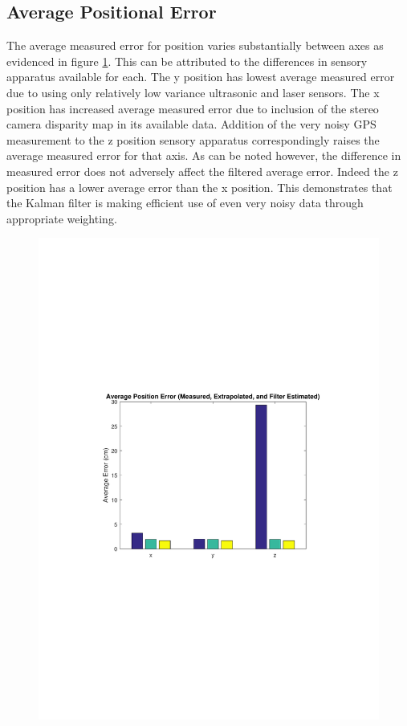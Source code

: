 \subsection{Average Positional Error}
The average measured error for position varies substantially between axes as evidenced in figure \ref{fig:analysisposition}. This can be attributed to the differences in sensory apparatus available for each. The y position has lowest average measured error due to using only relatively low variance ultrasonic and laser sensors. The x position has increased average measured error due to inclusion of the stereo camera disparity map in its available data. Addition of the very noisy GPS measurement to the z position sensory apparatus correspondingly raises the average measured error for that axis. As can be noted however, the difference in measured error does not adversely affect the filtered average error. Indeed the z position has a lower average error than the x position. This demonstrates that the Kalman filter is making efficient use of even very noisy data through appropriate weighting.

\begin{figure}[ht]
	\centering
	\includegraphics[height=0.40\textheight,trim={3cm 9.9cm 3cm 9.5cm},clip]{analysisposition.pdf}
	\label{fig:analysisposition}
\end{figure}

